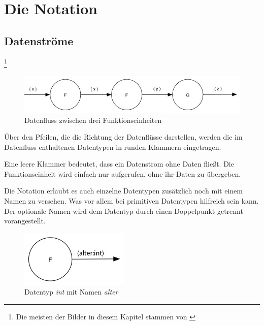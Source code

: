 \newcommand\blfootnote[1]{%
	\begingroup
	\renewcommand\thefootnote{}\footnote{#1}%
	\addtocounter{footnote}{-1}%
	\endgroup
}

\chapter{Die Notation}

\section{Datenströme}

 \blfootnote{Die meisten der Bilder in diesem Kapitel stammen von \cite{flowdesignorg}}
 
\begin{figure}[H]
	\includegraphics[width=1\linewidth]{./img/diagram1.png}
	\caption{Datenfluss zwischen drei Funktionseinheiten}
\end{figure}






Über den Pfeilen, die die Richtung der Datenflüsse darstellen, werden die im
Datenfluss enthaltenen Datentypen in runden Klammern eingetragen.

Eine leere Klammer bedeutet, dass ein Datenstrom ohne Daten fließt.
Die Funktionseinheit wird einfach nur aufgerufen, ohne ihr Daten zu übergeben.


Die Notation erlaubt es auch einzelne Datentypen zusätzlich noch mit einem Namen
zu versehen. Was vor allem bei primitiven Datentypen hilfreich sein kann. 
Der optionale Namen wird dem Datentyp durch einen Doppelpunkt getrennt vorangestellt.

\begin{figure}[H]
	\centering
	\includegraphics[width=.4\linewidth]{./img/diagramNamedType.png}
	\caption{Datentyp \textit{int} mit Namen \textit{alter}}
\end{figure}


